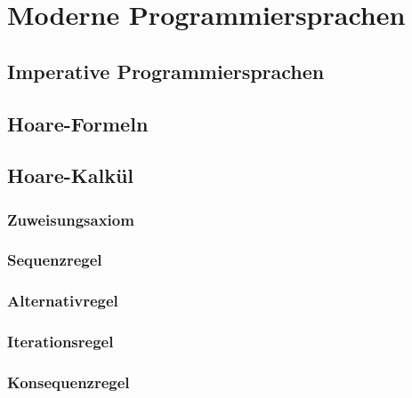 \chapter{Moderne Programmiersprachen}
\section{Imperative Programmiersprachen}
\section{Hoare-Formeln}
\section{Hoare-Kalkül}
\subsection{Zuweisungsaxiom}
\subsection{Sequenzregel}
\subsection{Alternativregel}
\subsection{Iterationsregel}
\subsection{Konsequenzregel}




